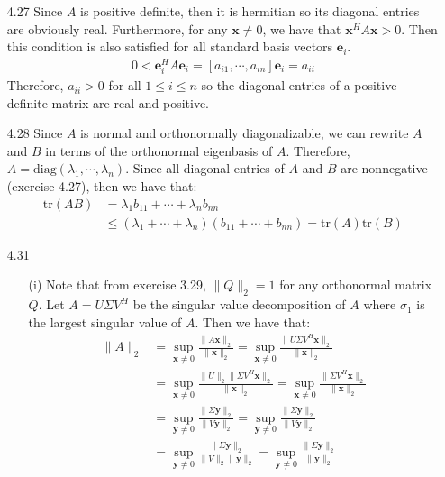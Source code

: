 \documentclass[letterpaper,12pt]{article}
\theoremstyle{definition}
\begin{document}
\begin{enumerate}
\begin{enumerate}
    \end{enumerate}
  \item[4.27]
    Since $A$ is positive definite, then it is hermitian so its diagonal entries are obviously real. Furthermore, for any $\mathbf{x} \neq 0$, we have that $\mathbf{x}^HA\mathbf{x} > 0$. Then this condition is also satisfied for all standard basis vectors $\mathbf{e}_i$.
    \begin{align*}
      0 < \mathbf{e}_i^HA\mathbf{e}_i = [a_{i1},\cdots,a_{in}]\mathbf{e}_i = a_{ii}
    \end{align*}
    Therefore, $a_{ii} > 0$ for all $1\leq i\leq n$ so the diagonal entries of a positive definite matrix are real and positive.
  \item[4.28]
    Since $A$ is normal and orthonormally diagonalizable, we can rewrite $A$ and $B$ in terms of the orthonormal eigenbasis of $A$. Therefore, $A = \text{diag}(\lambda_1,\cdots,\lambda_n)$. Since all diagonal entries of $A$ and $B$ are nonnegative (exercise 4.27), then we have that:
    \begin{align*}
      \text{tr}(AB) &= \lambda_1b_{11}+\cdots+\lambda_nb_{nn} \\
      &\leq (\lambda_1+\cdots+\lambda_n)(b_{11}+\cdots+b_{nn}) = \text{tr}(A)\text{tr}(B)
    \end{align*}
  \item[4.31]
    \begin{enumerate}
      \item[(i)]
        Note that from exercise 3.29, $\|Q\|_2 = 1$ for any orthonormal matrix $Q$. Let $A = U\Sigma V^H$ be the singular value decomposition of $A$ where $\sigma_1$ is the largest singular value of $A$. Then we have that:
        \begin{align*}
          \|A\|_2 &= \sup_{\mathbf{x}\neq0}\frac{\|A\mathbf{x}\|_2}{\|\mathbf{x}\|_2} = \sup_{\mathbf{x}\neq0}\frac{\|U\Sigma V^H\mathbf{x}\|_2}{\|\mathbf{x}\|_2}  \\
          &= \sup_{\mathbf{x}\neq0}\frac{\|U\|_2\|\Sigma V^H\mathbf{x}\|_2}{\|\mathbf{x}\|_2} = \sup_{\mathbf{x}\neq0}\frac{\|\Sigma V^H\mathbf{x}\|_2}{\|\mathbf{x}\|_2} \\
          &= \sup_{\mathbf{y}\neq0}\frac{\|\Sigma \mathbf{y}\|_2}{\|V\mathbf{y}\|_2} = \sup_{\mathbf{y}\neq0}\frac{\|\Sigma \mathbf{y}\|_2}{\|V\mathbf{y}\|_2} \\
          &= \sup_{\mathbf{y}\neq0}\frac{\|\Sigma \mathbf{y}\|_2}{\|V\|_2\|\mathbf{y}\|_2} = \sup_{\mathbf{y}\neq0}\frac{\|\Sigma \mathbf{y}\|_2}{\|\mathbf{y}\|_2} \\

\end{align*}
\end{enumerate}
\end{enumerate}
\end{document}
